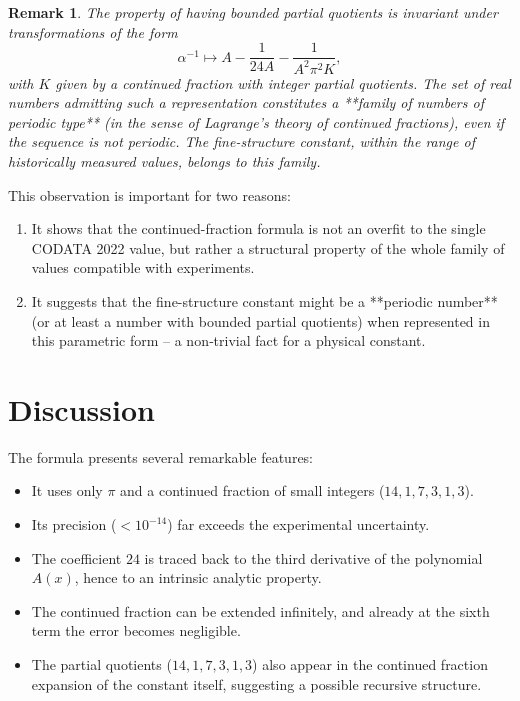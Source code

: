 \documentclass[12pt]{article}
\newtheorem{remark}{Remark}
\begin{document}
\begin{remark}
The property of having bounded partial quotients is invariant under transformations of the form
\[
\alpha^{-1} \mapsto A - \frac{1}{24A} - \frac{1}{A^2 \pi^2 K},
\]
with $K$ given by a continued fraction with integer partial quotients. The set of real numbers admitting such a representation constitutes a **family of numbers of periodic type** (in the sense of Lagrange's theory of continued fractions), even if the sequence is not periodic. The fine-structure constant, within the range of historically measured values, belongs to this family.
\end{remark}

This observation is important for two reasons:
\begin{enumerate}
    \item It shows that the continued-fraction formula is not an overfit to the single CODATA 2022 value, but rather a structural property of the whole family of values compatible with experiments.
    \item It suggests that the fine-structure constant might be a **periodic number** (or at least a number with bounded partial quotients) when represented in this parametric form – a non‑trivial fact for a physical constant.
\end{enumerate}

\section{Discussion}

The formula presents several remarkable features:

\begin{itemize}
    \item It uses only $\pi$ and a continued fraction of small integers ($14,1,7,3,1,3$).
    \item Its precision ($<10^{-14}$) far exceeds the experimental uncertainty.
    \item The coefficient $24$ is traced back to the third derivative of the polynomial $A(x)$, hence to an intrinsic analytic property.
    \item The continued fraction can be extended infinitely, and already at the sixth term the error becomes negligible.
    \item The partial quotients ($14,1,7,3,1,3$) also appear in the continued fraction expansion of the constant itself, suggesting a possible recursive structure.
\end{itemize}
\end{document}
